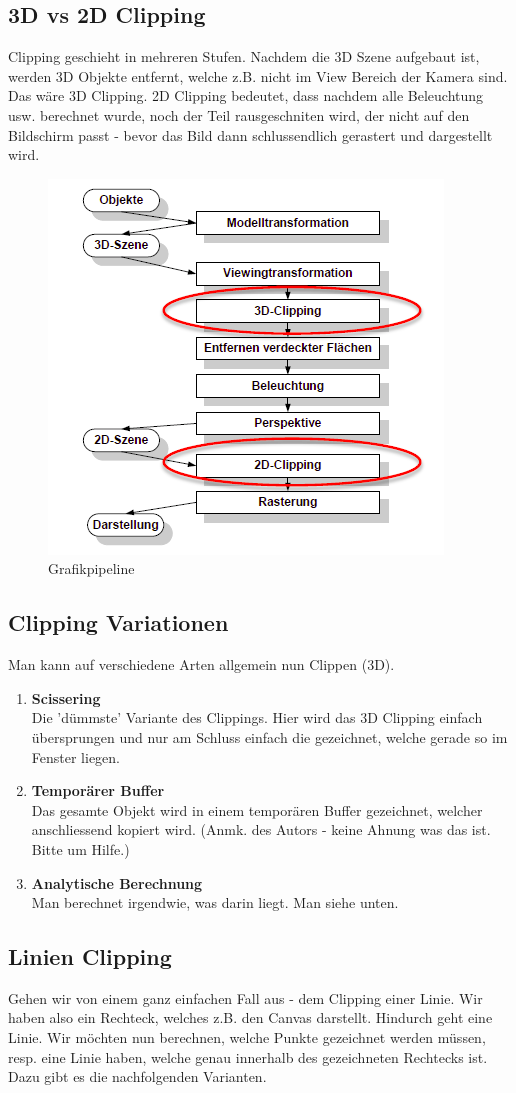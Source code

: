 \subsection{3D vs 2D Clipping}
Clipping geschieht in mehreren Stufen. Nachdem die 3D Szene aufgebaut ist, werden 3D Objekte entfernt, welche z.B. nicht im View Bereich der Kamera sind. Das wäre 3D Clipping. 2D Clipping bedeutet, dass nachdem alle Beleuchtung usw. berechnet wurde, noch der Teil rausgeschniten wird, der nicht auf den Bildschirm passt - bevor das Bild dann schlussendlich gerastert und dargestellt wird.
\begin{figure}[!ht]
	\centering
	\includegraphics[width=0.4\linewidth]{fig/grafikpipeline}
	\caption{Grafikpipeline}
	\label{fig:grafikpipeline}
\end{figure}

\subsection{Clipping Variationen}
Man kann auf verschiedene Arten allgemein nun Clippen (3D).
\begin{enumerate}
	\item \textbf{Scissering} \\
	Die 'dümmste' Variante des Clippings. Hier wird das 3D Clipping einfach übersprungen und nur am Schluss einfach die gezeichnet, welche gerade so im Fenster liegen.
	\item \textbf{Temporärer Buffer} \\
	Das gesamte Objekt wird in einem temporären Buffer gezeichnet, welcher anschliessend kopiert wird. (Anmk. des Autors - keine Ahnung was das ist. Bitte um Hilfe.)
	\item \textbf{Analytische Berechnung} \\ 
	Man berechnet irgendwie, was darin liegt. Man siehe unten.
\end{enumerate}

\subsection{Linien Clipping}
Gehen wir von einem ganz einfachen Fall aus - dem Clipping einer Linie. Wir haben also ein Rechteck, welches z.B. den Canvas darstellt. Hindurch geht eine Linie. Wir möchten nun berechnen, welche Punkte gezeichnet werden müssen, resp. eine Linie haben, welche genau innerhalb des gezeichneten Rechtecks ist. Dazu gibt es die nachfolgenden Varianten.

